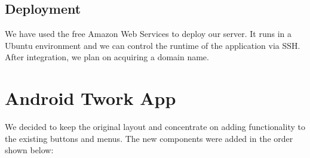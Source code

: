 \documentclass[a4paper,10pt]{article}
\begin{document}
\subsection{Deployment}
We have used the free Amazon Web Services to deploy our server. It runs in a Ubuntu environment and we can control the runtime of the application via SSH.
After integration, we plan on acquiring a domain name.




\section{Android Twork App}


We decided to keep the original layout and concentrate on adding functionality to the existing buttons and menus. The new components were added in the order shown below:
\end{document}
